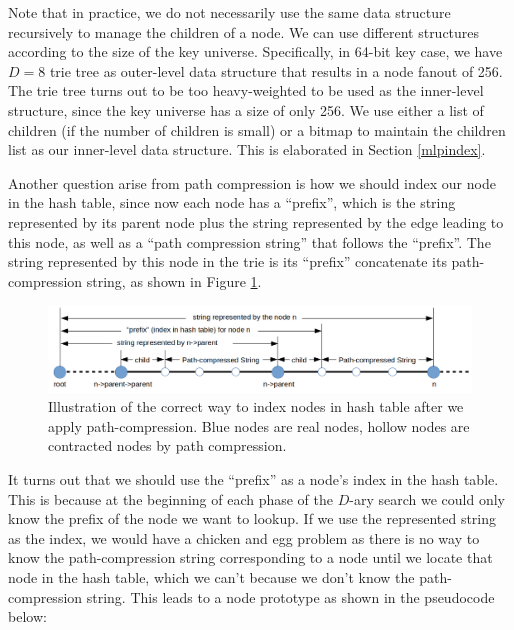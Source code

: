 \documentclass[11pt, usletter]{article}
\begin{document}
Note that in practice, we do not necessarily use the same data structure recursively to manage the children of a node. 
We can use different structures according to the size of the key universe. 
Specifically, in 64-bit key case, we have $D=8$ trie tree as outer-level data structure 
that results in a node fanout of 256. 
The trie tree turns out to be too heavy-weighted to be used as the inner-level structure, 
since the key universe has a size of only 256.
We use either a list of children (if the number of children is small) 
or a bitmap to maintain the children list as our inner-level data structure. 
This is elaborated in Section \ref{mlpindex}.
 
Another question arise from path compression is how we should index our node in the hash table, 
since now each node has a ``prefix'', which is the string represented by its parent node 
plus the string represented by the edge leading to this node, 
as well as a ``path compression string'' that follows the ``prefix''. 
The string represented by this node in the trie is its ``prefix'' concatenate its path-compression string, 
as shown in Figure \ref{mlpindex_node}.

\begin{figure}[!htb]
  \includegraphics[width=\linewidth]{mlpindex_node.png}
\caption{Illustration of the correct way to index nodes in hash table after we apply path-compression.
Blue nodes are real nodes, hollow nodes are contracted nodes by path compression.}
\label{mlpindex_node}
\end{figure}

It turns out that we should use the ``prefix'' as a node's index 
in the hash table. This is because at the beginning of each phase of the $D$-ary search
we could only know the prefix of the node we want to lookup. 
If we use the represented string as the index, we would have a chicken and egg problem as 
there is no way to know the path-compression string corresponding to a node
until we locate that node in the hash table, which we can't because we don't know the path-compression string. 
This leads to a node prototype as shown in the pseudocode below:
\end{document}
